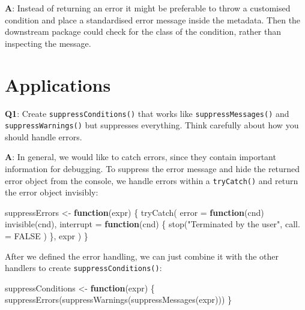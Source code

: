 \documentclass[
]{krantz}
\makeatletter
\newenvironment{Shaded}{\begin{snugshade}}{\end{snugshade}}
\newcommand{\ControlFlowTok}[1]{\textcolor[rgb]{0.13,0.29,0.53}{\textbf{#1}}}
\newcommand{\DataTypeTok}[1]{\textcolor[rgb]{0.13,0.29,0.53}{#1}}
\newcommand{\KeywordTok}[1]{\textcolor[rgb]{0.13,0.29,0.53}{\textbf{#1}}}
\newcommand{\NormalTok}[1]{#1}
\newcommand{\OtherTok}[1]{\textcolor[rgb]{0.56,0.35,0.01}{#1}}
\newcommand{\StringTok}[1]{\textcolor[rgb]{0.31,0.60,0.02}{#1}}
\newenvironment{kframe}{%
\medskip{}
\setlength{\fboxsep}{.8em}
 \def\at@end@of@kframe{}%
 \ifinner\ifhmode%
  \def\at@end@of@kframe{\end{minipage}}%
  \begin{minipage}{\columnwidth}%
 \fi\fi%
 \def\FrameCommand##1{\hskip\@totalleftmargin \hskip-\fboxsep
 \colorbox{shadecolor}{##1}\hskip-\fboxsep
     \hskip-\linewidth \hskip-\@totalleftmargin \hskip\columnwidth}%
 \MakeFramed {\advance\hsize-\width
   \@totalleftmargin\z@ \linewidth\hsize
   \@setminipage}}%
 {\par\unskip\endMakeFramed%
 \at@end@of@kframe}
\renewenvironment{Shaded}{\begin{kframe}}{\end{kframe}}
\renewcommand{\KeywordTok} [1]{\textcolor[rgb]{0.00,0.44,0.13}{{#1}}}
\renewcommand{\DataTypeTok}[1]{\textcolor[rgb]{0.56,0.13,0.00}{{#1}}}
\renewcommand{\StringTok}  [1]{\textcolor[rgb]{0.25,0.44,0.63}{{#1}}}
\renewcommand{\OtherTok}   [1]{\textcolor[rgb]{0.00,0.44,0.13}{{#1}}}
\renewcommand{\NormalTok}  [1]{{#1}}
\makeatother
\begin{document}
\textbf{{A}}: Instead of returning an error it might be preferable to throw a customised condition and place a standardised error message inside the metadata. Then the downstream package could check for the class of the condition, rather than inspecting the message.

\hypertarget{applications-1}{%
\section{Applications}\label{applications-1}}

\textbf{{Q1}}: Create \texttt{suppressConditions()} that works like \texttt{suppressMessages()} and \texttt{suppressWarnings()} but suppresses everything. Think carefully about how you should handle errors.

\textbf{{A}}: In general, we would like to catch errors, since they contain important information for debugging. To suppress the error message and hide the returned error object from the console, we handle errors within a \texttt{tryCatch()} and return the error object invisibly:

\begin{Shaded}
\begin{Highlighting}[]
\NormalTok{suppressErrors <-}\StringTok{ }\ControlFlowTok{function}\NormalTok{(expr) \{}
  \KeywordTok{tryCatch}\NormalTok{(}
    \DataTypeTok{error =} \ControlFlowTok{function}\NormalTok{(cnd) }\KeywordTok{invisible}\NormalTok{(cnd),}
    \DataTypeTok{interrupt =} \ControlFlowTok{function}\NormalTok{(cnd) \{}
      \KeywordTok{stop}\NormalTok{(}\StringTok{"Terminated by the user"}\NormalTok{,}
        \DataTypeTok{call. =} \OtherTok{FALSE}
\NormalTok{      )}
\NormalTok{    \},}
\NormalTok{    expr}
\NormalTok{  )}
\NormalTok{\}}
\end{Highlighting}
\end{Shaded}

After we defined the error handling, we can just combine it with the other handlers to create \texttt{suppressConditions()}:

\begin{Shaded}
\begin{Highlighting}[]
\NormalTok{suppressConditions <-}\StringTok{ }\ControlFlowTok{function}\NormalTok{(expr) \{}
  \KeywordTok{suppressErrors}\NormalTok{(}\KeywordTok{suppressWarnings}\NormalTok{(}\KeywordTok{suppressMessages}\NormalTok{(expr)))}
\NormalTok{\}}
\end{Highlighting}
\end{Shaded}
\end{document}

